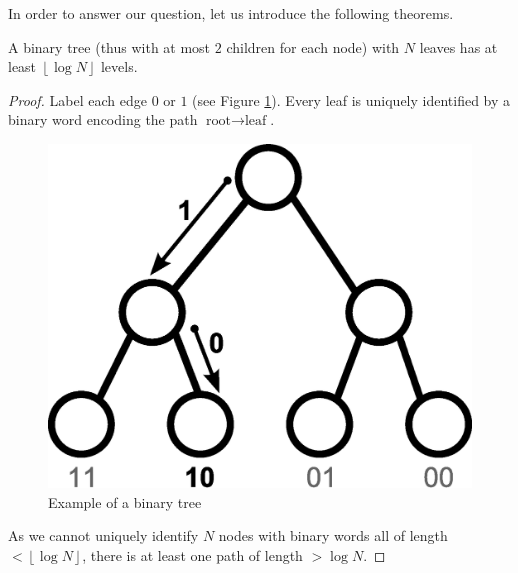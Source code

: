 In order to answer our question, let us introduce the following theorems.\\

\begin{theorem}
A binary tree (thus with at most $2$ children for each node) with $N$ leaves has at least $\left\lfloor \log N \right\rfloor$ levels.
\end{theorem}
\begin{proof}
Label each edge $0$ or $1$ (see Figure \ref{tree6}). Every leaf is uniquely identified by a binary word encoding the path $\text{root} \rightarrow \text{leaf}$.\\
\begin{figure}[htbp]
\centering
\includegraphics[scale=0.5]{images/CM2/tree6.eps}
\caption{Example of a binary tree}
\label{tree6}
\end{figure}
As we cannot uniquely identify $N$ nodes with binary words all of length $< \left\lfloor \log N \right\rfloor$, there is at least one path of length $> \log N$.
\QED
\end{proof}

